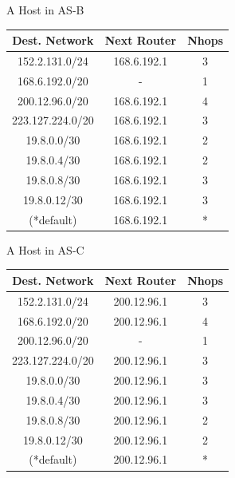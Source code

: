\documentclass[a4paper, 11pt]{article}
\begin{document}
	\begin{center}
		A Host in AS-B \\
		\vspace{2mm}
		
		\begin{tabular}{|c|c|c|}
			\hline
			Dest. Network  & Next Router & Nhops\\ 
			\hline
				152.2.131.0/24 & 168.6.192.1 & 3\\ 
				168.6.192.0/20 & - & 1\\ 
				200.12.96.0/20 & 168.6.192.1 & 4\\ 
				223.127.224.0/20 & 168.6.192.1 & 3\\ 
				19.8.0.0/30 & 168.6.192.1 & 2\\ 
				19.8.0.4/30 & 168.6.192.1 & 2\\ 
				19.8.0.8/30 & 168.6.192.1 & 3\\ 
				19.8.0.12/30 & 168.6.192.1 & 3\\ 
				(*default) & 168.6.192.1 & *\\
			\hline
		\end{tabular}
	\end{center}

	\begin{center}
		A Host in AS-C \\
		\vspace{2mm}
		
		\begin{tabular}{|c|c|c|}
			\hline
			Dest. Network  & Next Router & Nhops\\ 
			\hline
				152.2.131.0/24 & 200.12.96.1 & 3\\ 
				168.6.192.0/20 & 200.12.96.1 & 4\\ 
				200.12.96.0/20 & - & 1\\ 
				223.127.224.0/20 & 200.12.96.1 & 3\\ 
				19.8.0.0/30 & 200.12.96.1 & 3\\ 
				19.8.0.4/30 & 200.12.96.1 & 3\\ 
				19.8.0.8/30 & 200.12.96.1 & 2\\ 
				19.8.0.12/30 & 200.12.96.1 & 2\\ 
				(*default) & 200.12.96.1 & *\\
			\hline
		\end{tabular}
	\end{center}
\end{document}
